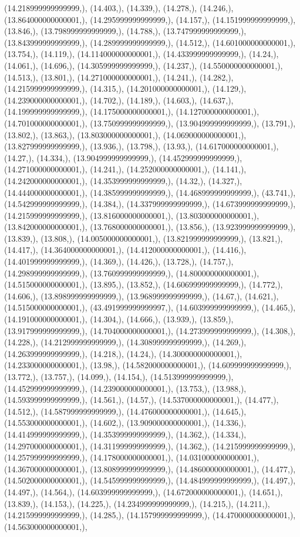 \documentclass{article}
\begin{document}
(14.218999999999999,), (14.403,), (14.339,), (14.278,), (14.246,), (13.864000000000001,), (14.295999999999999,), (14.157,), (14.151999999999999,), (13.846,), (13.798999999999999,), (14.788,), (13.747999999999999,), (13.843999999999999,), (14.289999999999999,), (14.512,), (14.601000000000001,), (13.754,), (14.119,), (14.114000000000001,), (14.433999999999999,), (14.24,), (14.061,), (14.696,), (14.305999999999999,), (14.237,), (14.550000000000001,), (14.513,), (13.801,), (14.271000000000001,), (14.241,), (14.282,), (14.215999999999999,), (14.315,), (14.201000000000001,), (14.129,), (14.239000000000001,), (14.702,), (14.189,), (14.603,), (14.637,), (14.199999999999999,), (14.175000000000001,), (14.127000000000001,), (14.701000000000001,), (13.750999999999999,), (13.904999999999999,), (13.791,), (13.802,), (13.863,), (13.803000000000001,), (14.069000000000001,), (13.827999999999999,), (13.936,), (13.798,), (13.93,), (14.617000000000001,), (14.27,), (14.334,), (13.904999999999999,), (14.452999999999999,), (14.271000000000001,), (14.241,), (14.252000000000001,), (14.141,), (14.242000000000001,), (14.353999999999999,), (14.32,), (14.327,), (14.444000000000001,), (14.385999999999999,), (14.468999999999999,), (43.741,), (14.542999999999999,), (14.384,), (14.337999999999999,), (14.673999999999999,), (14.215999999999999,), (13.816000000000001,), (13.803000000000001,), (13.842000000000001,), (13.768000000000001,), (13.856,), (13.923999999999999,), (13.839,), (13.808,), (14.005000000000001,), (13.821999999999999,), (13.821,), (14.417,), (14.364000000000001,), (14.412000000000001,), (14.416,), (14.401999999999999,), (14.369,), (14.426,), (13.728,), (14.757,), (14.298999999999999,), (13.760999999999999,), (14.800000000000001,), (14.515000000000001,), (13.895,), (13.852,), (14.606999999999999,), (14.772,), (14.606,), (13.898999999999999,), (13.968999999999999,), (14.67,), (14.621,), (14.515000000000001,), (43.491999999999997,), (14.603999999999999,), (14.465,), (14.191000000000001,), (14.304,), (14.666,), (13.939,), (13.859,), (13.917999999999999,), (14.704000000000001,), (14.273999999999999,), (14.308,), (14.228,), (14.212999999999999,), (14.308999999999999,), (14.269,), (14.263999999999999,), (14.218,), (14.24,), (14.300000000000001,), (14.233000000000001,), (13.98,), (14.582000000000001,), (14.609999999999999,), (13.772,), (13.757,), (14.099,), (14.154,), (14.513999999999999,), (14.452999999999999,), (14.239000000000001,), (13.753,), (13.988,), (14.593999999999999,), (14.561,), (14.57,), (14.537000000000001,), (14.477,), (14.512,), (14.587999999999999,), (14.476000000000001,), (14.645,), (14.553000000000001,), (14.602,), (13.909000000000001,), (14.336,), (14.414999999999999,), (14.353999999999999,), (14.362,), (14.334,), (14.297000000000001,), (14.311999999999999,), (14.362,), (14.215999999999999,), (14.257999999999999,), (14.178000000000001,), (14.031000000000001,), (14.367000000000001,), (13.808999999999999,), (14.486000000000001,), (14.477,), (14.502000000000001,), (14.545999999999999,), (14.484999999999999,), (14.497,), (14.497,), (14.564,), (14.603999999999999,), (14.672000000000001,), (14.651,), (13.839,), (14.153,), (14.225,), (14.234999999999999,), (14.215,), (14.211,), (14.215999999999999,), (14.285,), (14.157999999999999,), (14.470000000000001,), (14.563000000000001,), 
\end{document}
